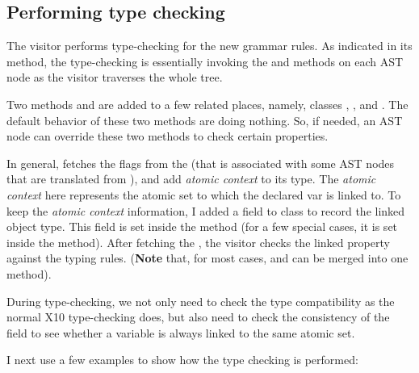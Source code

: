 \documentclass{article}
\begin{document}
\subsection{Performing type checking}
\label{sec:typechecking}

The visitor  performs type-checking for the new grammar rules. As indicated in its  method, the type-checking is essentially invoking the  and  methods on each AST node as the visitor traverses the whole tree.

Two methods   and  are added to a few related places, namely, classes , , and . The default behavior of these two methods are doing nothing. So, if needed, an AST node can override these two methods to check certain properties.

In general,   fetches the  flags from the  (that is associated with some AST nodes that are translated from ), and add \textit{atomic context} to its type. The \textit{atomic context} here represents the atomic set to which the declared var is linked to.  To keep the \textit{atomic context} information,  I added a  field   to class  to record the linked object type. This field is set inside the  method (for a few special cases, it is set inside the  method). After fetching the , the visitor checks the linked property against the typing rules. (\textbf{Note} that, for most cases,  and  can be merged into one method).

During type-checking, we not only need to check the type compatibility as the normal X10 type-checking does, but also need to check the consistency of the  field to see whether a variable is always linked to the same atomic set.

I next use a few examples to show how the type checking is performed:
\end{document}
